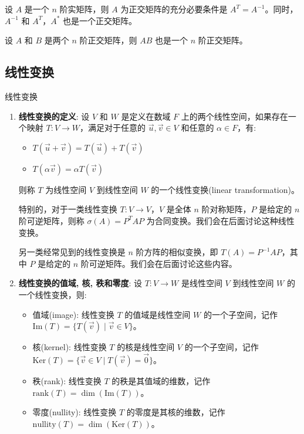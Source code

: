 \documentclass[a4paper,12pt]{ctexart}
\begin{document}
\begin{mythm}{}{}
    设 $A$ 是一个 $n$ 阶实矩阵，则 $A$ 为正交矩阵的充分必要条件是 $A^T = A^{ -1}$。同时，$A^{-1}$ 和 $A^T$，$A^*$ 也是一个正交矩阵。
\end{mythm}

\begin{mythm}{}{}
    设 $A$ 和 $B$ 是两个 $n$ 阶正交矩阵，则 $AB$ 也是一个 $n$ 阶正交矩阵。
\end{mythm}

\subsection{线性变换}

\begin{mydef}{线性变换}{}
\begin{enumerate}
    \item \textbf{线性变换的定义}: 设 $V$ 和 $W$ 是定义在数域 $F$ 上的两个线性空间，如果存在一个映射 $T: V \to W$，满足对于任意的 $\vec{u}, \vec{v} \in V$ 和任意的 $\alpha \in F$，有:
    \begin{itemize}
        \item $T(\vec{u} + \vec{v}) = T(\vec{u}) + T(\vec{v})$
        \item $T(\alpha \vec{v}) = \alpha T(\vec{v})$
    \end{itemize}
    则称 $T$ 为线性空间 $V$ 到线性空间 $W$ 的一个线性变换(linear transformation)。
    
    特别的，对于一类线性变换 $T: V \to V$，$V$ 是全体 $n$ 阶对称矩阵，$P$ 是给定的 $n$ 阶可逆矩阵，则称 $\sigma(A) = P^TAP$ 为合同变换。我们会在后面讨论这种线性变换。
    
    另一类经常见到的线性变换是 $n$ 阶方阵的相似变换，即 $T(A) = P^{-1}AP$，其中 $P$ 是给定的 $n$ 阶可逆矩阵。我们会在后面讨论这些内容。
    
    \item \textbf{线性变换的值域, 核, 秩和零度}: 设 $T: V \to W$ 是线性空间 $V$ 到线性空间 $W$ 的一个线性变换，则:
    \begin{itemize}
        \item 值域(image): 线性变换 $T$ 的值域是线性空间 $W$ 的一个子空间，记作 $\text{Im}(T) = \{ T(\vec{v}) \mid \vec{v} \in V \}$。
        \item 核(kernel): 线性变换 $T$ 的核是线性空间 $V$ 的一个子空间，记作 $\text{Ker}(T) = \{ \vec{v} \in V \mid T(\vec{v}) = \vec{0} \}$。
        \item 秩(rank): 线性变换 $T$ 的秩是其值域的维数，记作 $\text{rank}(T) = \dim(\text{Im}(T))$。
        \item 零度(nullity): 线性变换 $T$ 的零度是其核的维数，记作 $\text{nullity}(T) = \dim(\text{Ker}(T))$。
    \end{itemize}
\end{enumerate}
\end{mydef}
\end{document}
